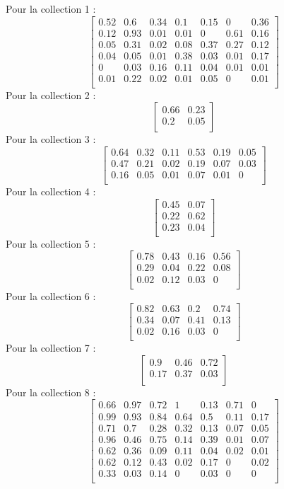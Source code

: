 \documentclass[
]{article}
\begin{document}
Pour la collection 1 :
\[\begin{bmatrix} 0.52 &0.6 &0.34 &0.1 &0.15 &0 &0.36 \\0.12 &0.93 &0.01 &0.01 &0 &0.61 &0.16 \\0.05 &0.31 &0.02 &0.08 &0.37 &0.27 &0.12 \\0.04 &0.05 &0.01 &0.38 &0.03 &0.01 &0.17 \\0 &0.03 &0.16 &0.11 &0.04 &0.01 &0.01 \\0.01 &0.22 &0.02 &0.01 &0.05 &0 &0.01 \\ \end{bmatrix}\]
Pour la collection 2 :
\[\begin{bmatrix} 0.66 &0.23 \\0.2 &0.05 \\ \end{bmatrix}\] Pour la
collection 3 :
\[\begin{bmatrix} 0.64 &0.32 &0.11 &0.53 &0.19 &0.05 \\0.47 &0.21 &0.02 &0.19 &0.07 &0.03 \\0.16 &0.05 &0.01 &0.07 &0.01 &0 \\ \end{bmatrix}\]
Pour la collection 4 :
\[\begin{bmatrix} 0.45 &0.07 \\0.22 &0.62 \\0.23 &0.04 \\ \end{bmatrix}\]
Pour la collection 5 :
\[\begin{bmatrix} 0.78 &0.43 &0.16 &0.56 \\0.29 &0.04 &0.22 &0.08 \\0.02 &0.12 &0.03 &0 \\ \end{bmatrix}\]
Pour la collection 6 :
\[\begin{bmatrix} 0.82 &0.63 &0.2 &0.74 \\0.34 &0.07 &0.41 &0.13 \\0.02 &0.16 &0.03 &0 \\ \end{bmatrix}\]
Pour la collection 7 :
\[\begin{bmatrix} 0.9 &0.46 &0.72 \\0.17 &0.37 &0.03 \\ \end{bmatrix}\]
Pour la collection 8 :
\[\begin{bmatrix} 0.66 &0.97 &0.72 &1 &0.13 &0.71 &0 \\0.99 &0.93 &0.84 &0.64 &0.5 &0.11 &0.17 \\0.71 &0.7 &0.28 &0.32 &0.13 &0.07 &0.05 \\0.96 &0.46 &0.75 &0.14 &0.39 &0.01 &0.07 \\0.62 &0.36 &0.09 &0.11 &0.04 &0.02 &0.01 \\0.62 &0.12 &0.43 &0.02 &0.17 &0 &0.02 \\0.33 &0.03 &0.14 &0 &0.03 &0 &0 \\ \end{bmatrix}\]
\end{document}
